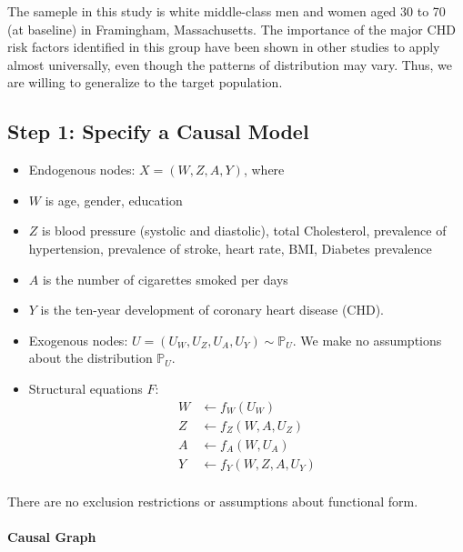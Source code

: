 \documentclass[]{article}
\let\oldparagraph\paragraph
\renewcommand{\paragraph}[1]{\oldparagraph{#1}\mbox{}}
\begin{document}
The sameple in this study is white middle-class men and women aged 30 to
70 (at baseline) in Framingham, Massachusetts. The importance of the
major CHD risk factors identified in this group have been shown in other
studies to apply almost universally, even though the patterns of
distribution may vary. Thus, we are willing to generalize to the target
population.

\subsection{Step 1: Specify a Causal
Model}\label{step-1-specify-a-causal-model}

\begin{itemize}
\item
  Endogenous nodes: \(X = (W,Z,A,Y)\), where
\item
  \(W\) is age, gender, education
\item
  \(Z\) is blood pressure (systolic and diastolic), total Cholesterol,
  prevalence of hypertension, prevalence of stroke, heart rate, BMI,
  Diabetes prevalence
\item
  \(A\) is the number of cigarettes smoked per days
\item
  \(Y\) is the ten-year development of coronary heart disease (CHD).
\item
  Exogenous nodes: \(U = (U_{W}, U_{Z}, U_A , U_Y) \sim \mathbb{P}_U\).
  We make no assumptions about the distribution \(\mathbb{P}_U\).
\item
  Structural equations \(F\): \[
  \begin{aligned}
  W &\leftarrow  f_W (U_W) \\
  Z  &\leftarrow  f_Z (W, A, U_Z) \\
  A  &\leftarrow  f_A (W, U_A) \\
  Y  &\leftarrow  f_Y (W, Z, A, U_Y) \\
  \end{aligned}
  \]
\end{itemize}

There are no exclusion restrictions or assumptions about functional
form.

\paragraph{Causal Graph}\label{causal-graph}
\end{document}
